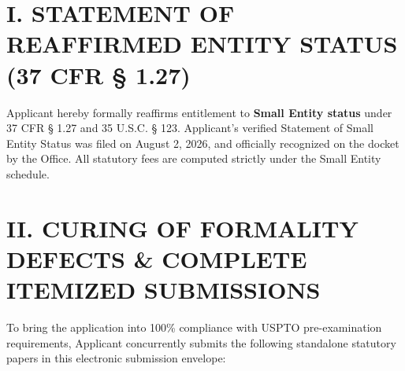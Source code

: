 \documentclass[11pt,letterpaper]{article}
\begin{document}
\section*{I. STATEMENT OF REAFFIRMED ENTITY STATUS (37 CFR \S{} 1.27)}

Applicant hereby formally reaffirms entitlement to \textbf{Small Entity status} under 37 CFR \S{} 1.27 and 35 U.S.C. \S{} 123. Applicant's verified Statement of Small Entity Status was filed on August 2, 2026, and officially recognized on the docket by the Office. All statutory fees are computed strictly under the Small Entity schedule.

\section*{II. CURING OF FORMALITY DEFECTS \& COMPLETE ITEMIZED SUBMISSIONS}

To bring the application into 100\% compliance with USPTO pre-examination requirements, Applicant concurrently submits the following standalone statutory papers in this electronic submission envelope:
\end{document}
